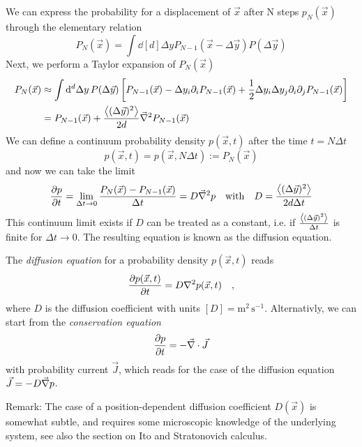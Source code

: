 \documentclass{notebook}
\begin{document}
We can express the probability for a displacement of $\vec{x}$ after N steps $p_N(\vec{x})$ through the elementary relation
%
\begin{equation}
P_N(\vec{x}) = \int{\dd[d]{\Delta y} P_{N-1}(\vec{x} - \Delta \vec{y}) P(\Delta \vec{y})}
\end{equation}
%
Next, we perform a Taylor expansion of $P_N(\vec{x})$
%
\begin{align*}
P_N(\vec{x}) &\approx \int{\dd[d]{\Delta y} P(\Delta \vec{y}) \left[ 
	P_{N-1}(\vec{x}) - \Delta y_i \partial_i P_{N-1}(\vec{x}) + \frac{1}{2}  \Delta y_i \Delta y_j \partial_i \partial_j P_{N-1}(\vec{x}) \right]} \\
&= P_{N-1}(\vec{x}) + \frac{\expval{(\Delta \vec{y})^2}}{2 d} \vec{\nabla}^2 P_{N-1}(\vec{x})	
\end{align*}
%
We can define a continuum probability density $p(\vec{x},t)$ after the time $t = N \Delta t$
%
\begin{equation}
p(\vec{x},t) = p(\vec{x}, N \Delta t) := P_N(\vec{x})
\end{equation}
%
and now we can take the limit
%
\begin{equation}
\pdv{p}{t} = \lim_{\Delta t \to 0} \frac{P_N(\vec{x}) - P_{N-1}(\vec{x})}{\Delta t} = D \vec{\nabla}^2 p \quad \mathrm{with} \quad D = \frac{\expval{(\Delta \vec{y})^2}}{2 d \Delta t}
\end{equation}
%
This continuum limit exists if $D$ can be treated as a constant, i.e. if $\frac{\expval{(\Delta \vec{y})^2}}{\Delta t}$ is finite for $\Delta t \to 0$. The resulting equation is known as the diffusion equation.

\newpage
%
\begin{theorem}
	The \textit{diffusion equation} for a probability density $p(\vec{x}, t)$ reads
	\begin{equation}
	\pdv{p(\vec{x}, t)}{t} = D \nabla^2 p(\vec{x}, t) \quad,
	\end{equation}
	where $D$ is the diffusion coefficient with units $[D]=\mathrm{m}^2\,\mathrm{s}^{-1}$.
	Alternativly, we can start from the \textit{conservation equation}
	\begin{equation}
	\pdv{p}{t} = - \vec{\nabla} \cdot \vec{J}
	\end{equation}
	with probability current $\vec{J}$, 
	which reads for the case of the diffusion equation $\vec{J} = -D \vec{\nabla} p$.
\end{theorem}
%
Remark: The case of a position-dependent diffusion coefficient $D(\vec{x})$ is somewhat subtle, 
and requires some microscopic knowledge of the underlying system, see also the section on Ito and Stratonovich calculus.
\end{document}
